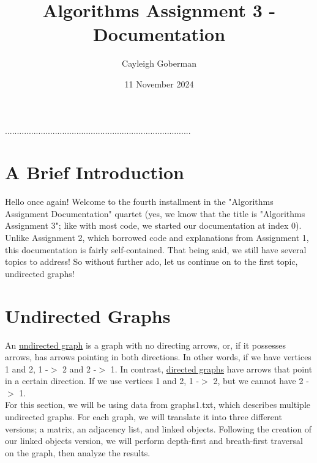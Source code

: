 \documentclass{article}
\title{Algorithms Assignment 3 - Documentation}
\author{Cayleigh Goberman}
\date{11 November 2024}
\begin{document}
\maketitle

\begin{center}
..............................................................................
\end{center}

\tableofcontents

\pagebreak

\section{A Brief Introduction}
Hello once again! Welcome to the fourth installment in the "Algorithms Assignment Documentation" quartet (yes, we know that the title is "Algorithms Assignment 3"; like with most code, we started our documentation at index 0). Unlike Assignment 2, which borrowed code and explanations from Assignment 1, this documentation is fairly self-contained. That being said, we still have several topics to address! So without further ado, let us continue on to the first topic, undirected graphs! 

\pagebreak
\section{Undirected Graphs}
An \underline{undirected graph} is a graph with no directing arrows, or, if it possesses arrows, has arrows pointing in both directions. In other words, if we have vertices 1 and 2, 1 -$>$ 2 and 2 -$>$ 1. In contrast, \underline{directed graphs} have arrows that point in a certain direction. If we use vertices 1 and 2, 1 -$>$ 2, but we cannot have 2 -$>$ 1. \\
For this section, we will be using data from graphs1.txt, which describes multiple undirected graphs. For each graph, we will translate it into three different versions; a matrix, an adjacency list, and linked objects. Following the creation of our linked objects version, we will perform depth-first and breath-first traversal on the graph, then analyze the results. 
\end{document}
